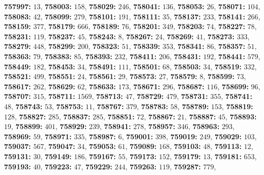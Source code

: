 \textsf{\bfseries 757997:} $13$, \textsf{\bfseries 758003:} $158$, \textsf{\bfseries 758029:} $246$, \textsf{\bfseries 758041:} $136$, \textsf{\bfseries 758053:} $26$, \textsf{\bfseries 758071:} $104$, \textsf{\bfseries 758083:} $42$, \textsf{\bfseries 758099:} $279$, \textsf{\bfseries 758101:} $191$, \textsf{\bfseries 758111:} $35$, \textsf{\bfseries 758137:} $233$, \textsf{\bfseries 758141:} $266$, \textsf{\bfseries 758159:} $377$, \textsf{\bfseries 758179:} $666$, \textsf{\bfseries 758189:} $76$, \textsf{\bfseries 758201:} $349$, \textsf{\bfseries 758203:} $74$, \textsf{\bfseries 758227:} $78$, \textsf{\bfseries 758231:} $119$, \textsf{\bfseries 758237:} $45$, \textsf{\bfseries 758243:} $8$, \textsf{\bfseries 758267:} $24$, \textsf{\bfseries 758269:} $41$, \textsf{\bfseries 758273:} $333$, \textsf{\bfseries 758279:} $448$, \textsf{\bfseries 758299:} $200$, \textsf{\bfseries 758323:} $51$, \textsf{\bfseries 758339:} $353$, \textsf{\bfseries 758341:} $86$, \textsf{\bfseries 758357:} $51$, \textsf{\bfseries 758363:} $79$, \textsf{\bfseries 758383:} $85$, \textsf{\bfseries 758393:} $232$, \textsf{\bfseries 758411:} $206$, \textsf{\bfseries 758431:} $192$, \textsf{\bfseries 758441:} $579$, \textsf{\bfseries 758449:} $182$, \textsf{\bfseries 758453:} $34$, \textsf{\bfseries 758491:} $111$, \textsf{\bfseries 758501:} $68$, \textsf{\bfseries 758503:} $34$, \textsf{\bfseries 758519:} $332$, \textsf{\bfseries 758521:} $499$, \textsf{\bfseries 758551:} $24$, \textsf{\bfseries 758561:} $29$, \textsf{\bfseries 758573:} $27$, \textsf{\bfseries 758579:} $8$, \textsf{\bfseries 758599:} $73$, \textsf{\bfseries 758617:} $262$, \textsf{\bfseries 758629:} $62$, \textsf{\bfseries 758633:} $173$, \textsf{\bfseries 758671:} $296$, \textsf{\bfseries 758687:} $116$, \textsf{\bfseries 758699:} $96$, \textsf{\bfseries 758707:} $315$, \textsf{\bfseries 758711:} $1569$, \textsf{\bfseries 758713:} $47$, \textsf{\bfseries 758729:} $479$, \textsf{\bfseries 758731:} $355$, \textsf{\bfseries 758741:} $48$, \textsf{\bfseries 758743:} $53$, \textsf{\bfseries 758753:} $11$, \textsf{\bfseries 758767:} $379$, \textsf{\bfseries 758783:} $58$, \textsf{\bfseries 758789:} $153$, \textsf{\bfseries 758819:} $128$, \textsf{\bfseries 758827:} $285$, \textsf{\bfseries 758837:} $285$, \textsf{\bfseries 758851:} $72$, \textsf{\bfseries 758867:} $21$, \textsf{\bfseries 758887:} $45$, \textsf{\bfseries 758893:} $19$, \textsf{\bfseries 758899:} $401$, \textsf{\bfseries 758929:} $239$, \textsf{\bfseries 758941:} $278$, \textsf{\bfseries 758957:} $346$, \textsf{\bfseries 758963:} $293$, \textsf{\bfseries 758969:} $59$, \textsf{\bfseries 758971:} $335$, \textsf{\bfseries 758987:} $6$, \textsf{\bfseries 759001:} $398$, \textsf{\bfseries 759019:} $249$, \textsf{\bfseries 759029:} $103$, \textsf{\bfseries 759037:} $567$, \textsf{\bfseries 759047:} $34$, \textsf{\bfseries 759053:} $61$, \textsf{\bfseries 759089:} $168$, \textsf{\bfseries 759103:} $48$, \textsf{\bfseries 759113:} $12$, \textsf{\bfseries 759131:} $30$, \textsf{\bfseries 759149:} $186$, \textsf{\bfseries 759167:} $55$, \textsf{\bfseries 759173:} $152$, \textsf{\bfseries 759179:} $13$, \textsf{\bfseries 759181:} $653$, \textsf{\bfseries 759193:} $40$, \textsf{\bfseries 759223:} $47$, \textsf{\bfseries 759229:} $244$, \textsf{\bfseries 759263:} $119$, \textsf{\bfseries 759287:} $779$, 
